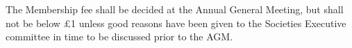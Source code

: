  The Membership fee shall be decided at the Annual General Meeting, but shall not be below \pounds 1 unless good reasons have been given to the Societies Executive committee in time to be discussed prior to the AGM.\ \\